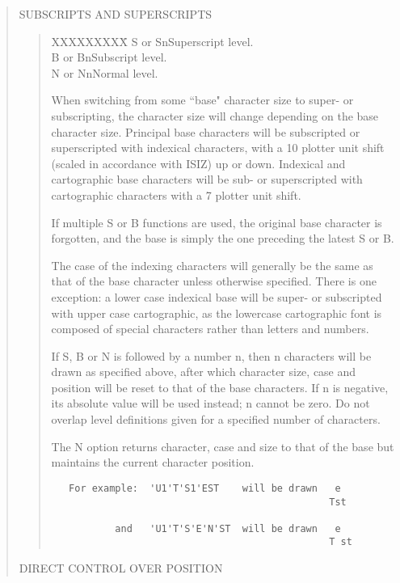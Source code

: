 \begin{quote}
SUBSCRIPTS AND SUPERSCRIPTS

\begin{quote}
\begin{tabbing}
XXXXXXXXX\=\kill
S or Sn\>Superscript level.\\
B or Bn\>Subscript level.\\
N or Nn\>Normal level.
\end{tabbing}

When switching from some ``base" character size to super- or
subscripting, the character size will change depending on
the base character size.  Principal base characters will be
subscripted or superscripted with indexical characters, with
a 10 plotter unit shift (scaled in accordance with ISIZ) up
or down.  Indexical and cartographic base characters will be
sub- or superscripted with cartographic characters with a
7 plotter unit shift.

If multiple S or B functions are used, the original base
character is forgotten, and the base is simply the one
preceding the latest S or B.

The case of the indexing characters will generally be the
same as that of the base character unless otherwise specified.
There is one exception: a lower case indexical base will be
super- or subscripted with upper case cartographic, as the
lowercase cartographic font is composed of special characters
rather than letters and numbers.

If S, B or N is followed by a number n, then n characters will
be drawn as specified above, after which character size, case
and position will be reset to that of the base characters.
If n is negative, its absolute value will be used instead;  n
cannot be zero.  Do not overlap level definitions given for a
specified number of characters.

The N option returns character, case and size to that of the
base but maintains the current character position.

\begin{verbatim}
   For example:  'U1'T'S1'EST    will be drawn   e
                                                Tst

           and   'U1'T'S'E'N'ST  will be drawn   e
                                                T st
\end{verbatim}
\end{quote}

DIRECT CONTROL OVER POSITION


\end{quote}
